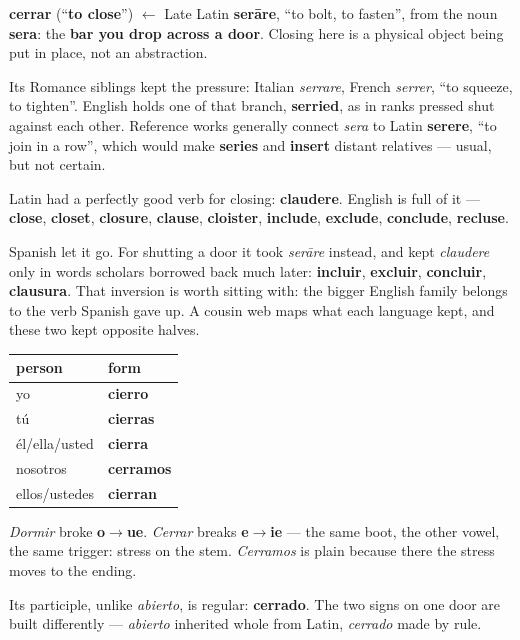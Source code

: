 \begin{cousinweb}
\textbf{cerrar} (\textquotedblleft{}\textbf{to close}\textquotedblright{}) $\leftarrow$ Late Latin \textbf{serāre}, \textquotedblleft{}to bolt, to fasten\textquotedblright{}, from the noun \textbf{sera}: the \textbf{bar you drop across a door}. Closing here is a physical object being put in place, not an abstraction.

Its Romance siblings kept the pressure: Italian \emph{serrare}, French \emph{serrer}, \textquotedblleft{}to squeeze, to tighten\textquotedblright{}. English holds one of that branch, \textbf{serried}, as in ranks pressed shut against each other. Reference works generally connect \emph{sera} to Latin \textbf{serere}, \textquotedblleft{}to join in a row\textquotedblright{}, which would make \textbf{series} and \textbf{insert} distant relatives — usual, but not certain.
\end{cousinweb}

\begin{culture}
Latin had a perfectly good verb for closing: \textbf{claudere}. English is full of it — \textbf{close}, \textbf{closet}, \textbf{closure}, \textbf{clause}, \textbf{cloister}, \textbf{include}, \textbf{exclude}, \textbf{conclude}, \textbf{recluse}.

Spanish let it go. For shutting a door it took \emph{serāre} instead, and kept \emph{claudere} only in words scholars borrowed back much later: \textbf{incluir}, \textbf{excluir}, \textbf{concluir}, \textbf{clausura}. That inversion is worth sitting with: the bigger English family belongs to the verb Spanish gave up. A cousin web maps what each language kept, and these two kept opposite halves.
\end{culture}

\begin{grammarlens}[title={Grammar Lens: e$\to$ie, and the sign on the door}]
\noindent
\begin{tabularx}{\linewidth}{@{}>{\raggedright\arraybackslash}X>{\raggedright\arraybackslash}X@{}}
\toprule
\textbf{person} & \textbf{form} \\
\midrule
yo & \textbf{cierro} \\
tú & \textbf{cierras} \\
él/ella/usted & \textbf{cierra} \\
nosotros & \textbf{cerramos} \\
ellos/ustedes & \textbf{cierran} \\
\bottomrule
\end{tabularx}

\emph{Dormir} broke \textbf{o$\to$ue}. \emph{Cerrar} breaks \textbf{e$\to$ie} — the same boot, the other vowel, the same trigger: stress on the stem. \emph{Cerramos} is plain because there the stress moves to the ending.

Its participle, unlike \emph{abierto}, is regular: \textbf{cerrado}. The two signs on one door are built differently — \emph{abierto} inherited whole from Latin, \emph{cerrado} made by rule.
\end{grammarlens}

